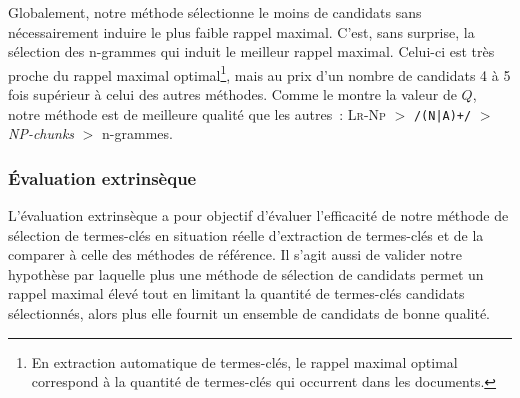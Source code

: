         Globalement, notre méthode sélectionne le moins de
        candidats sans nécessairement induire le plus faible rappel maximal.
        C'est, sans surprise, la sélection des n-grammes qui induit le meilleur
        rappel maximal. Celui-ci est très proche du rappel maximal
        optimal\footnote{En extraction automatique de termes-clés, le rappel
        maximal optimal correspond à la quantité de termes-clés qui occurrent
        dans les documents.}, mais
        au prix d'un nombre de candidats 4 à 5 fois supérieur à celui des autres
        méthodes. Comme le montre la valeur de $Q$, notre méthode
        est de meilleure qualité que les autres~: \textsc{Lr-Np} $>$
        \texttt{/(N|A)+/} $>$ \textit{NP-chunks} $>$ n-grammes.

      \subsubsection{Évaluation extrinsèque}
      \label{subsubsec:main:domain_independent_keyphrase_extraction-keyphrase_candidate_selection-evaluation-extrinsic_evaluation}
        L'évaluation extrinsèque a pour objectif d'évaluer l'efficacité de notre
        méthode de sélection de termes-clés en situation réelle d'extraction de
        termes-clés et de la comparer à celle des méthodes de référence.
        Il s'agit aussi de valider notre hypothèse par laquelle plus une méthode
        de sélection de candidats permet un rappel maximal élevé tout en
        limitant la quantité de termes-clés candidats sélectionnés, alors plus
        elle fournit un ensemble de candidats de bonne qualité.

